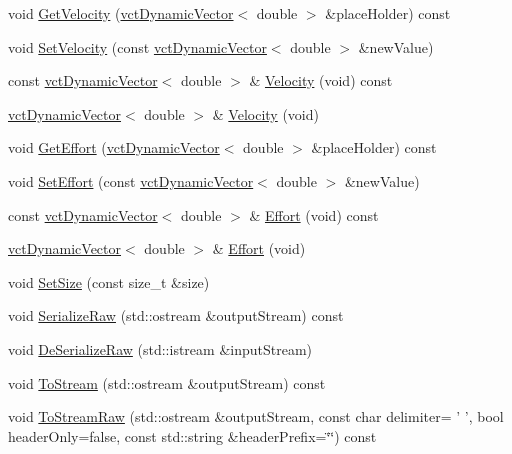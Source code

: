 \begin{DoxyCompactItemize}
void \hyperlink{classprm_state_joint_a3a1539e17781df3a741b13e508abe816}{Get\-Velocity} (\hyperlink{classvct_dynamic_vector}{vct\-Dynamic\-Vector}$<$ double $>$ \&place\-Holder) const 
\item 
void \hyperlink{classprm_state_joint_a08b8697e75c378fff9ea9138203edc69}{Set\-Velocity} (const \hyperlink{classvct_dynamic_vector}{vct\-Dynamic\-Vector}$<$ double $>$ \&new\-Value)
\item 
const \hyperlink{classvct_dynamic_vector}{vct\-Dynamic\-Vector}$<$ double $>$ \& \hyperlink{classprm_state_joint_a10a5ebcf87751cfe98183eeddcc692b2}{Velocity} (void) const 
\item 
\hyperlink{classvct_dynamic_vector}{vct\-Dynamic\-Vector}$<$ double $>$ \& \hyperlink{classprm_state_joint_a4596021a996cef711ded69fba5730d4f}{Velocity} (void)
\item 
void \hyperlink{classprm_state_joint_a9eed229698c49dd94ebbf229074d8ee6}{Get\-Effort} (\hyperlink{classvct_dynamic_vector}{vct\-Dynamic\-Vector}$<$ double $>$ \&place\-Holder) const 
\item 
void \hyperlink{classprm_state_joint_ac4432a634804a235861565d3fdfd43e8}{Set\-Effort} (const \hyperlink{classvct_dynamic_vector}{vct\-Dynamic\-Vector}$<$ double $>$ \&new\-Value)
\item 
const \hyperlink{classvct_dynamic_vector}{vct\-Dynamic\-Vector}$<$ double $>$ \& \hyperlink{classprm_state_joint_ab57e6d319cf42f98fe2e5cea13336914}{Effort} (void) const 
\item 
\hyperlink{classvct_dynamic_vector}{vct\-Dynamic\-Vector}$<$ double $>$ \& \hyperlink{classprm_state_joint_ab910471156d69ccfe80a6cb23d360673}{Effort} (void)
\item 
void \hyperlink{classprm_state_joint_a1749d1631bbc5b6be2c5d57e98f69eac}{Set\-Size} (const size\-\_\-t \&size)
\item 
void \hyperlink{classprm_state_joint_aae454c19e9e76cb4cec859163a2f47dc}{Serialize\-Raw} (std\-::ostream \&output\-Stream) const 
\item 
void \hyperlink{classprm_state_joint_a6c055544199df69a68484c590030ca22}{De\-Serialize\-Raw} (std\-::istream \&input\-Stream)
\item 
void \hyperlink{classprm_state_joint_a8ce2230719d787d242d0d9a119833574}{To\-Stream} (std\-::ostream \&output\-Stream) const 
\item 
void \hyperlink{classprm_state_joint_ab6f5d21cac1773971679f8a7005396b7}{To\-Stream\-Raw} (std\-::ostream \&output\-Stream, const char delimiter= ' ', bool header\-Only=false, const std\-::string \&header\-Prefix=\char`\"{}\char`\"{}) const 

\end{DoxyCompactItemize}
